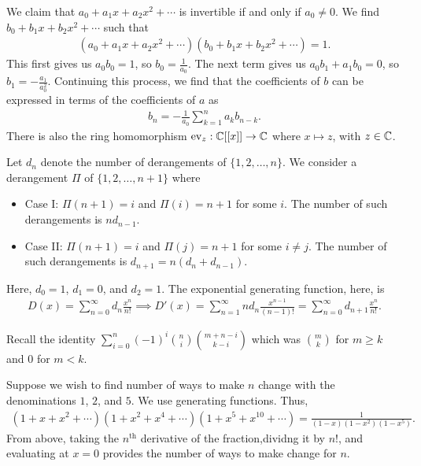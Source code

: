 We claim that $a_{0}+a_{1}x+a_{2}x^{2}+\cdots$ is invertible if and only if $a_{0} \neq 0$. We find $b_{0}+b_{1}x+b_{2}x^{2}+\cdots$ such that
\begin{align}
    (a_{0}+a_{1}x+a_{2}x^{2}+\cdots)(b_{0}+b_{1}x+b_{2}x^{2}+\cdots) = 1.
\end{align}
This first gives us $a_{0}b_{0} = 1$, so $b_{0} = \frac{1}{a_{0}}$. The next term gives us $a_{0}b_{1}+a_{1}b_{0} = 0$, so $b_{1} = -\frac{a_{1}}{a_{0}^{2}}$. Continuing this process, we find that the coefficients of $b$ can be expressed in terms of the coefficients of $a$ as
\begin{align}
    b_{n} = -\frac{1}{a_{0}} \sum_{k=1}^{n} a_{k}b_{n-k}.
\end{align}
There is also the ring homomorphism $\operatorname{ev}_{z}:\mathbb{C}[[x]] \to \mathbb{C}$ where $x \mapsto z$, with $z \in \mathbb{C}$.

\begin{example}
    Let $d_{n}$ denote the number of derangements of $\{1,2,\ldots,n\}$. We consider a derangement $\Pi$ of $\{1,2,\ldots,n+1\}$ where
    \begin{itemize}
        \item Case I: $\Pi(n+1) = i$ and $\Pi(i) = n+1$ for some $i$. The number of such derangements is $nd_{n-1}$.
        \item Case II: $\Pi(n+1) = i$ and $\Pi(j) = n+1$ for some $i \neq j$. The number of such derangements is $d_{n+1} = n(d_{n}+d_{n-1})$.
    \end{itemize}
    Here, $d_{0} = 1$, $d_{1} = 0$, and $d_{2} = 1$. The exponential generating function, here, is
    \begin{align}
        D(x) = \sum_{n=0}^{\infty} d_{n} \frac{x^{n}}{n!} \implies D'(x) = \sum_{n=1}^{\infty} nd_{n} \frac{x^{n-1}}{(n-1)!} = \sum_{n=0}^{\infty} d_{n+1} \frac{x^{n}}{n!}.
    \end{align}
\end{example}

Recall the identity $\sum_{i=0}^{n} (-1)^{i} \binom{n}{i} \binom{m+n-i}{k-i}$ which was $\binom{m}{k}$ for $m \geq k$ and $0$ for $m < k$.

\begin{example}
    Suppose we wish to find number of ways to make $n$ change with the denominations $1$, $2$, and $5$. We use generating functions. Thus,
    \begin{align}
        (1+x+x^{2}+\cdots)(1+x^{2}+x^{4}+\cdots)(1+x^{5}+x^{10}+\cdots) = \frac{1}{(1-x)(1-x^{2})(1-x^{5})}.
    \end{align}
    From above, taking the $n^{\text{th}}$ derivative of the fraction,dividng it by $n!$, and evaluating at $x = 0$ provides the number of ways to make change for $n$.
\end{example}
